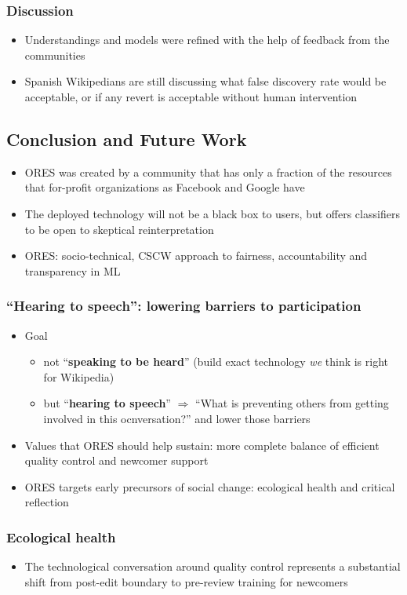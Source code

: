 \documentclass[12pt,a4paper]{article}
\begin{document}
\subsubsection{Discussion}
\begin{itemize}
\item Understandings and models were refined with the help of feedback from the communities
\item Spanish Wikipedians are still discussing what false discovery rate would be acceptable, or if any revert is acceptable without human intervention
\end{itemize}
\subsection{Conclusion and Future Work}
\begin{itemize}
\item ORES was created by a community that has only a fraction of the resources that for-profit organizations as Facebook and Google have
\item The deployed technology will not be a black box to users, but offers classifiers to be open to skeptical reinterpretation
\item ORES: socio-technical, CSCW approach to fairness, accountability and transparency in ML
\end{itemize}
\subsubsection{``Hearing to speech'': lowering barriers to participation}
\begin{itemize}
\item Goal
\begin{itemize}
\item not ``\textbf{speaking to be heard}'' (build exact technology \textit{we} think is right for Wikipedia)
\item but ``\textbf{hearing to speech}''
\(\Rightarrow\) ``What is preventing others from getting involved in this ocnversation?'' and lower those barriers
\end{itemize}
\item Values that ORES should help sustain: more complete balance of efficient quality control and newcomer support
\item ORES targets early precursors of social change: ecological health and critical reflection
\end{itemize}
\subsubsection{Ecological health}
\begin{itemize}
\item The technological conversation around quality control represents a substantial shift from post-edit boundary to pre-review training for newcomers
\end{itemize}
\end{document}
